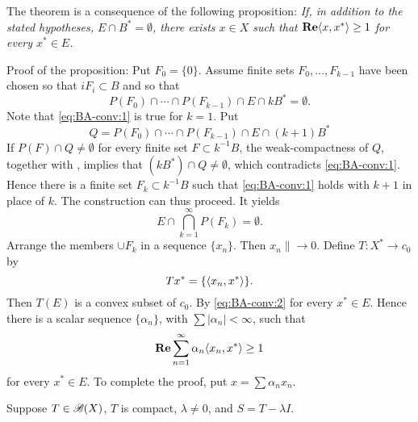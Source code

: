 \begin{enumerate}
\begin{excopy}
\begin{itemize}
The theorem is a consequence of the following proposition:
\textsl{
 If, in addition to the
stated hypotheses, \(E \cap B^* = \emptyset\), there exists \(x \in X\)
 such that \(\mathop{\bf Re}\nolimits \langle x, x^* \rangle \geq 1\) for
every \(x^* \in E\).
}

Proof of the proposition: Put \(F_0 = \{0\}\).
 Assume finite sets \(F_0,\ldots,F_{k-1}\) have been
chosen so that \(iF_i \subset B\) and so that
\begin{equation} \label{eq:BA-conv:1}
P(F_0) \cap \cdots \cap P(F_{k-1}) \cap E \cap kB^* = \emptyset.
\end{equation}
Note that \eqref{eq:BA-conv:1} is true for \(k = 1\). Put
\begin{equation*}
Q = P(F_0) \cap \cdots \cap P(F_{k-1}) \cap E \cap (k+1)B^* 
\end{equation*}
If \(P(F) \cap Q \neq \emptyset\) for every finite set
 \(F \subset k^{-1}B\), the weak\upstar-compactness of $Q$,
together with , implies that \((kB^*) \cap Q \neq \emptyset\),
 which contradicts \eqref{eq:BA-conv:1}. Hence there
is a finite set \(F_k \subset k^{-1}B\) such that \eqref{eq:BA-conv:1} holds
 with \(k+1\) in place of $k$. The construction
can thus proceed. It yields
\begin{equation} \label{eq:BA-conv:2}
E \cap \bigcap_{k=1}^\infty P(F_k) = \emptyset.
\end{equation}
Arrange the members \(\cup F_k\) in a sequence \(\{x_n\}\).
 Then \(x_n\| \to 0\). Define \(T: X^* \to c_0\)
by
\begin{equation*}
Tx^* = \{\langle x_n,x^* \rangle\}.
\end{equation*}
Then \(T(E)\) is a convex subset of \(c_0\). By \eqref{eq:BA-conv:2}
for every \(x^* \in E\). Hence there is a scalar sequence \(\{\alpha_n\}\),
 with \(\sum |\alpha_n| < \infty\), such that
\begin{equation*}
\mathop{\bf Re}\nolimits \sum_{n=1}^\infty \alpha_n \langle x_n,x^* \rangle \geq 1
\end{equation*}
for every \(x^* \in E\). To complete the proof, put \(x = \sum \alpha_n x_n\).

\end{itemize}
\end{excopy}



\unfinished

\begin{excopy}
Suppose \(T \in \mathscr{B}(X)\), $T$ is compact, \(\lambda \neq 0\),
 and \(S = T - \lambda I\).
\begin{itemize}


\end{itemize}
\end{excopy}
\end{enumerate}
